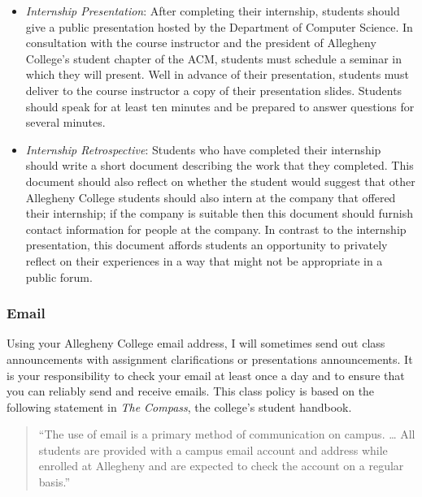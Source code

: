 \begin{itemize}
	\item {\em Internship Presentation}: After completing their internship, students should give a public presentation
		hosted by the Department of Computer Science. In consultation with the course instructor and the president of
		Allegheny College's student chapter of the ACM, students must schedule a seminar in which they will
		present.  Well in advance of their presentation, students must deliver to the course instructor a copy of their 
		presentation slides.  Students should speak for at least ten minutes and be prepared to answer questions for
		several minutes.     

	\item {\em Internship Retrospective}: Students who have completed their internship should write a short document
		describing the work that they completed.  This document should also reflect on whether the student would suggest
		that other Allegheny College students should also intern at the company that offered their internship;  if the
		company is suitable then this document should furnish contact information for people at the company.  In
		contrast to the internship presentation, this document affords students an opportunity to privately reflect on
		their experiences in a way that might not be appropriate in a public forum.

\end{itemize}

\subsubsection*{Email}

Using your Allegheny College email address, I will sometimes send out class announcements with assignment clarifications
or presentations announcements. It is your responsibility to check your email at least once a day and to ensure that you
can reliably send and receive emails. This class policy is based on the following statement in {\em The Compass}, the
college's student handbook.

\vspace*{-.1in}
\begin{quote}
``The use of email is a primary method of communication on campus. \ldots
All students are provided with a campus email account and address while
enrolled at Allegheny and are expected to check the account on a regular
basis.'' 
\end{quote}
\vspace*{-.15in}

